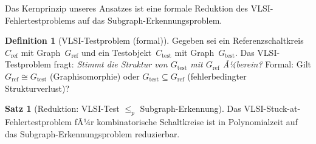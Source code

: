 ﻿\documentclass[a4paper,12pt]{article}
\theoremstyle{definition}
\newtheorem{definition}{Definition}
\newtheorem{satz}{Satz}
\begin{document}
Das Kernprinzip unseres Ansatzes ist eine formale Reduktion des
VLSI-Fehlertestproblems auf das Subgraph-Erkennungsproblem.

\begin{definition}[VLSI-Testproblem (formal)]
  Gegeben sei ein Referenzschaltkreis~$C_{\mathrm{ref}}$ mit
  Graph~$G_{\mathrm{ref}}$ und ein Testobjekt~$C_{\mathrm{test}}$ mit
  Graph~$G_{\mathrm{test}}$.
  Das VLSI-Testproblem fragt:
  \emph{Stimmt die Struktur von $G_{\mathrm{test}}$ mit
  $G_{\mathrm{ref}}$ Ã¼berein?}
  Formal: Gilt $G_{\mathrm{ref}} \cong G_{\mathrm{test}}$
  (Graphisomorphie) oder $G_{\mathrm{test}} \subseteq G_{\mathrm{ref}}$
  (fehlerbedingter Strukturverlust)?
\end{definition}

\begin{satz}[Reduktion: VLSI-Test $\leq_p$ Subgraph-Erkennung]
  \label{satz:reduktion}\sloppy
  Das VLSI-Stuck-at-Fehlertestproblem fÃ¼r kombinatorische Schaltkreise
  ist in Polynomialzeit auf das Subgraph-Erkennungs\-problem reduzierbar.
\end{satz}
\end{document}
